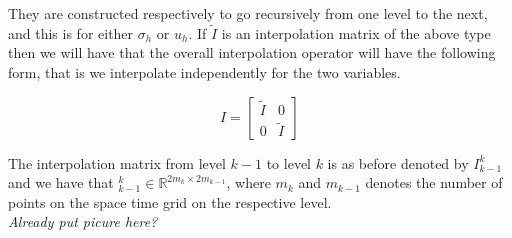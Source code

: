 \documentclass[../draft_1.tex]{subfiles}
\begin{document}
They are constructed respectively to go recursively from one level to the next, and this is for either $\sigma_h$ or $u_h$. If $\tilde{I}$ is an interpolation matrix of the above type then we will have that the overall interpolation operator will have the following form, that is we interpolate independently for the two variables. 
\begin{ceqn}
	\begin{equation}
	I = \begin{bmatrix}
	\tilde{I} & 0 \\
	0 & 	\tilde{I}
	\end{bmatrix}
	\end{equation}
	\end{ceqn}

The interpolation matrix from level $k-1$ to level $k$ is as before denoted by $I_{k-1}^k$ and we have that  $_{k-1}^k \in \mathbb{R}^{2m_k \times 2m_{k-1}}$, where $m_k$ and $m_{k-1}$ denotes the number of points on the space time grid on the respective level. 
\smallskip
\\
\textit{Already put picure here?}
\smallskip
\\
\end{document}
